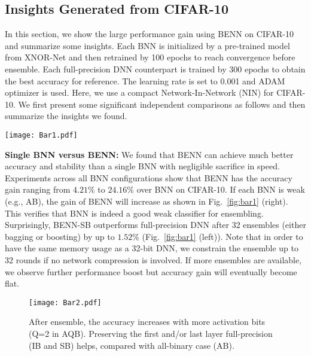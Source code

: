 \documentclass[10pt,twocolumn,letterpaper]{article}
\begin{document}
\subsection{Insights Generated from CIFAR-10}
In this section, we show the large performance gain using BENN on CIFAR-10 and summarize some insights. Each BNN is initialized by a pre-trained model from XNOR-Net \cite{rastegari2016xnor} and then retrained by 100 epochs to reach convergence before ensemble. Each full-precision DNN counterpart is trained by 300 epochs to obtain the best accuracy for reference. The learning rate is set to 0.001 and ADAM optimizer is used. Here, we use a compact Network-In-Network (NIN) for CIFAR-10. We first present some significant independent comparisons as follows and then summarize the insights we found.
\begin{figure*}[t]
    \centering
    \texttt{[image: Bar1.pdf]}
    \caption{\textbf{Left: }BENN can increase the test accuracy significantly with more ensembles. It can even achieve better accuracy than its full-precision counterpart under Semi-BNN (SB) case. \textbf{Right: }Boosting strongly outperforms bagging in All-BNN (AB) case where each BNN has larger bias.}
    \label{fig:bar1}
    \vspace{-5mm}
\end{figure*}

\textbf{Single BNN versus BENN: } We found that BENN can achieve much better accuracy and stability than a single BNN with negligible sacrifice in speed. Experiments across all BNN configurations show that BENN has the accuracy gain ranging from $4.21\%$ to $24.16\%$ over BNN on CIFAR-10. If each BNN is weak (e.g., AB), the gain of BENN will increase as shown in Fig.~\ref{fig:bar1} (right). This verifies that BNN is indeed a good weak classifier for ensembling. Surprisingly, BENN-SB outperforms full-precision DNN after 32 ensembles (either bagging or boosting) by up to $1.52\%$ (Fig.~\ref{fig:bar1} (left)). Note that in order to have the same memory usage as a 32-bit DNN, we constrain the ensemble up to 32 rounds if no network compression is involved. If more ensembles are available, we observe further performance boost but accuracy gain will eventually become flat.

\begin{figure}
    \vspace{2mm}
    \centering
    \texttt{[image: Bar2.pdf]}
    \vspace{-3mm}
    \caption{After ensemble, the accuracy increases with more activation bits (Q=2 in AQB). Preserving the first and/or last layer full-precision (IB and SB) helps, compared with all-binary case (AB).}
    \label{fig:bar2}
    \vspace{-5mm}
\end{figure}
\end{document}
